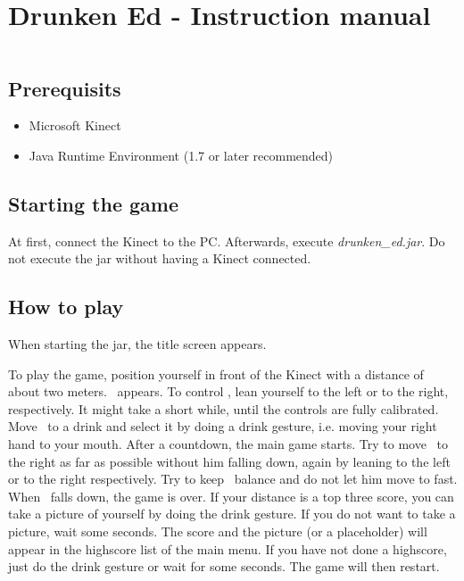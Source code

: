 \documentclass{article}
\begin{document}
\section*{Drunken Ed - Instruction manual}

$ $\\

\subsection*{Prerequisits}

\begin{itemize}
\item Microsoft Kinect
\item Java Runtime Environment (1.7 or later recommended)
\end{itemize}

\subsection*{Starting the game}

At first, connect the Kinect to the PC. Afterwards, execute \textit{drunken\_ed.jar}. Do not execute the jar without having a Kinect connected.

\subsection*{How to play}

When starting the jar, the title screen appears.



To play the game, position yourself in front of the Kinect with a distance of about two meters. \ed\ appears. To control \ed, lean yourself to the left or to the right, respectively. It might take a short while, until the controls are fully calibrated. Move \ed\ to a drink and select it by doing a drink gesture, i.e. moving your right hand to your mouth. After a countdown, the main game starts. Try to move \ed\ to the right as far as possible without him falling down, again by leaning to the left or to the right respectively. Try to keep \eds\ balance and do not let him move to fast. When \ed\ falls down, the game is over. If your distance is a top three score, you can take a picture of yourself by doing the drink gesture. If you do not want to take a picture, wait some seconds. The score and the picture (or a placeholder) will appear in the highscore list of the main menu. If you have not done a highscore, just do the drink gesture or wait for some seconds. The game will then restart.
\end{document}
